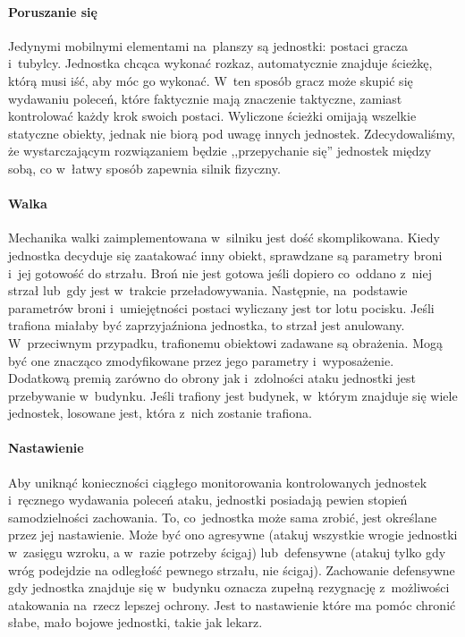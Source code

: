 \documentclass[licencjacka]{pracamgr}
\begin{document}
      \paragraph{Poruszanie się}
	Jedynymi mobilnymi elementami na~planszy są jednostki: postaci gracza i~tubylcy. Jednostka chcąca wykonać rozkaz, automatycznie znajduje
	ścieżkę, którą musi iść, aby móc go wykonać. W~ten sposób gracz może skupić się wydawaniu poleceń, które faktycznie mają
	znaczenie taktyczne, zamiast kontrolować każdy krok swoich postaci. Wyliczone ścieżki omijają wszelkie statyczne obiekty, jednak
	nie biorą pod uwagę innych jednostek. Zdecydowaliśmy, że wystarczającym rozwiązaniem będzie ,,przepychanie się'' jednostek między sobą,
	co w~łatwy sposób zapewnia silnik fizyczny.
      \paragraph{Walka}
	Mechanika walki zaimplementowana w~silniku jest dość skomplikowana. Kiedy jednostka decyduje się zaatakować inny obiekt,
	sprawdzane są parametry broni i~jej gotowość do strzału. Broń nie jest gotowa jeśli dopiero co~oddano z~niej strzał lub~gdy
	jest w~trakcie przeładowywania. Następnie, na~podstawie parametrów broni i~umiejętności postaci wyliczany jest tor lotu pocisku.
	Jeśli trafiona miałaby być zaprzyjaźniona jednostka, to strzał jest anulowany. W~przeciwnym przypadku, trafionemu obiektowi zadawane są
	obrażenia. Mogą być one znacząco zmodyfikowane przez jego parametry i~wyposażenie. Dodatkową premią zarówno do obrony jak i~zdolności
	ataku jednostki jest przebywanie w~budynku. Jeśli trafiony jest budynek, w~którym znajduje się wiele jednostek, losowane jest, która z~nich
	zostanie trafiona.
      \paragraph{Nastawienie}
	Aby uniknąć konieczności ciągłego monitorowania kontrolowanych jednostek i~ręcznego wydawania poleceń ataku, jednostki posiadają pewien
	stopień samodzielności zachowania. To, co~jednostka może sama zrobić, jest określane przez jej nastawienie. Może być ono agresywne
	(atakuj wszystkie wrogie jednostki w~zasięgu wzroku, a w~razie potrzeby ścigaj) lub~defensywne (atakuj tylko gdy wróg podejdzie na
	odległość pewnego strzału, nie ścigaj). Zachowanie defensywne gdy jednostka znajduje się w~budynku oznacza zupełną rezygnację
	z~możliwości atakowania na~rzecz lepszej ochrony. Jest to nastawienie które ma pomóc chronić słabe, mało bojowe jednostki, takie jak lekarz.
\end{document}
